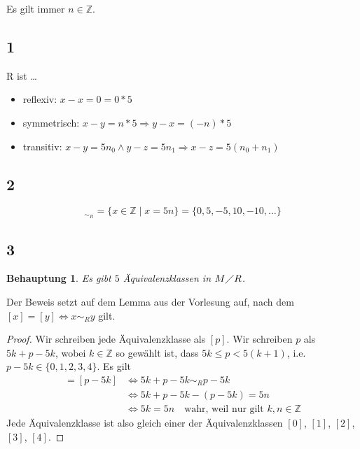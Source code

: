 \documentclass[a4paper,10pt]{article}
\newtheorem*{claim}{Behauptung}
\begin{document}
Es gilt immer $n \in \mathbb{Z}$.

\subsection*{1}

R ist \dots
\begin{itemize}
 \item reflexiv: $x - x = 0 = 0 * 5$
 \item symmetrisch: $x - y = n * 5 \Rightarrow y - x = (-n) * 5$
 \item transitiv: $x - y = 5n_0 \land y - z = 5n_1 \Rightarrow x - z = 5(n_0 + n_1)$
\end{itemize}

\subsection*{2}

\begin{equation*}
 [0]_{\sim_{R}} = \{x \in \mathbb{Z} \mid x = 5n\} = \{0, 5, -5, 10, -10, \dots\}
\end{equation*}

\subsection*{3}

\begin{claim}
 Es gibt $5$ Äquivalenzklassen in $M\diagup R$.
\end{claim}

Der Beweis setzt auf dem Lemma aus der Vorlesung auf, nach dem $[x] = [y] \Leftrightarrow x \sim_R y$ gilt.

\begin{proof}
 Wir schreiben jede Äquivalenzklasse als $[p]$.
 Wir schreiben $p$ als $5k + p - 5k$, wobei $k \in \mathbb{Z}$ so gewählt ist, dass $5k \le p < 5(k + 1)$, i.e. $p - 5k \in \{0, 1, 2, 3, 4\}$.
 Es gilt 
 \begin{align*}
  [5k + p - 5k] = [p - 5k] & \Leftrightarrow 5k + p - 5k \sim_R p - 5k\\
  & \Leftrightarrow 5k + p - 5k - (p - 5k) = 5n\\
  & \Leftrightarrow 5k = 5n \quad \text{wahr, weil nur gilt } k, n \in \mathbb{Z}
 \end{align*}
 Jede Äquivalenzklasse ist also gleich einer der Äquivalenzklassen $[0]$, $[1]$, $[2]$, $[3]$, $[4]$.
\end{proof}
\end{document}
